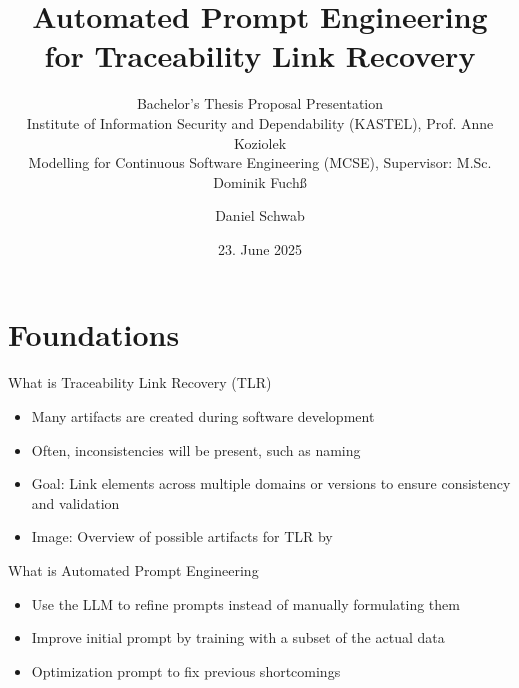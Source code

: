 \documentclass{sdqbeamer}
\title[Automated Prompt Engineering for Traceability Link Recovery]{Automated Prompt Engineering for Traceability Link Recovery}
\subtitle{Bachelor's Thesis Proposal Presentation \\
Institute of Information Security and Dependability (KASTEL), Prof. Anne Koziolek \\
Modelling for Continuous Software Engineering (MCSE), Supervisor:  M.Sc. Dominik Fuchß}
\author{Daniel Schwab}
\date[23.\,06.\,2025]{23. June 2025}
\begin{document}
\begin{frame}[title white horizontal, picture=images/palladio_bauplan, kitlogo=white]
\titlepage
\end{frame}



\section{Foundations}


\begin{frame}[picture 50 vertical, picture=images/artifact_overview_Fuchß.png]{What is Traceability Link Recovery (TLR)}
	\begin{itemize}
		\item Many artifacts are created during software development
            \item Often, inconsistencies will be present, such as naming
            \item Goal: Link elements across multiple domains or versions to ensure consistency and validation
            \item Image: Overview of possible artifacts for TLR by \cite{fuchss2025LiSSAGeneric}
	\end{itemize}
\end{frame}


\begin{frame}[picture 66 vertical, picture=images/iterative_core_loop.pdf]{What is Automated Prompt Engineering}
    \begin{itemize}
        \item Use the LLM to refine prompts instead of manually formulating them
        \item Improve initial prompt by training with a subset of the actual data
        \item Optimization prompt to fix previous shortcomings
    \end{itemize} 
\end{frame}

\begin{comment}
\begin{frame}
\frametitle{The LiSSA Framework}
    \begin{figure}
        \centering
        \texttt{[image: images/LiSSA\_pipeline\_Fuchß.png]}
        \caption{LiSSA pipeline by \cite{fuchss2025LiSSAGeneric}}
        \label{fig:enter-label}
    \end{figure}
    \begin{itemize}
        \item This work will add to the prompting step of the LiSSA framework
    \end{itemize}
    
\end{frame}
\end{comment}
\end{document}
